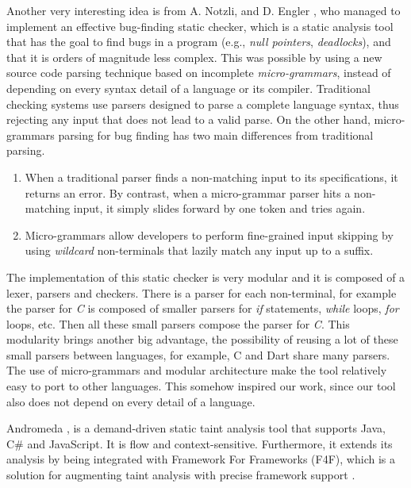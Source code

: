 Another very interesting idea is from A. Notzli, and D. Engler \cite{microgrammars}, who managed to implement an effective bug-finding static checker, which is a static analysis tool that has the goal to find bugs in a program (e.g., \textit{null pointers}, \textit{deadlocks}), and that it is orders of magnitude less complex. This was possible by using a new source code parsing technique based on incomplete \textit{micro-grammars}, instead of depending on every syntax detail of a language or its compiler. Traditional checking systems use parsers designed to parse a complete language syntax, thus rejecting any input that does not lead to a valid parse. On the other hand, micro-grammars parsing for bug finding has two main differences from traditional parsing.

\begin{enumerate}
  \item When a traditional parser finds a non-matching input to its specifications, it returns an error. By contrast, when a micro-grammar parser hits a non-matching input, it simply slides forward by one token and tries again.

  \item  Micro-grammars allow developers to perform fine-grained input skipping by using \textit{wildcard} non-terminals that lazily match any input up to a suffix.

\end{enumerate}

The implementation of this static checker is very modular and it is composed of a lexer, parsers and checkers. There is a parser for each non-terminal, for example the parser for \textit{C} is composed of smaller parsers for \textit{if} statements, \textit{while} loops, \textit{for} loops, etc. Then all these small parsers compose the parser for \textit{C}. This modularity brings another big advantage, the possibility of reusing a lot of these small parsers between languages, for example, C and Dart share many parsers.
The use of micro-grammars and modular architecture make the tool relatively easy to port to other languages. This somehow inspired our work, since our tool also does not depend on every detail of a language.

Andromeda \cite{tripp2013andromeda}, is a demand-driven static taint analysis tool that supports Java, C\# and JavaScript. It is flow and context-sensitive. Furthermore, it extends its analysis by being integrated with Framework For Frameworks (F4F), which is a solution for augmenting taint analysis with precise framework support \cite{sridharan2011f4f}. 



